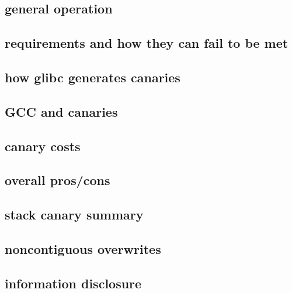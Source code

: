 \subsection{general operation}


\subsection{requirements and how they can fail to be met}

\subsection{how glibc generates canaries}


\subsection{GCC and canaries}


\subsection{canary costs}


\subsection{overall pros/cons}


\subsection{stack canary summary}


\subsection{noncontiguous overwrites}





\subsection{information disclosure}
